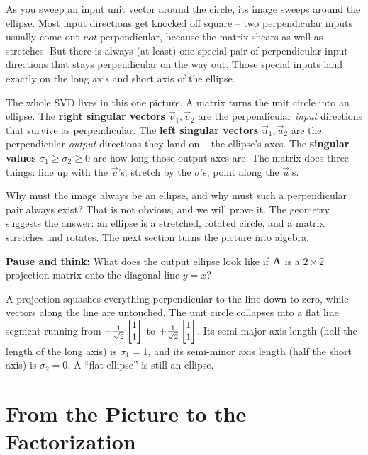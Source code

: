 As you sweep
an input unit vector around the circle, its image sweeps around the ellipse. Most
input directions get knocked off square -- two perpendicular inputs usually come
out \emph{not} perpendicular, because the matrix shears as well as stretches. But
there is always (at least) one special pair of perpendicular input directions
that stays perpendicular on the way out. Those special inputs land exactly on the
long axis and short axis of the ellipse.

\begin{intuitionbox}
The whole SVD lives in this one picture. A matrix turns the unit circle into an
ellipse. The \textbf{right singular vectors} $\vec{v}_1, \vec{v}_2$ are the
perpendicular \emph{input} directions that survive as perpendicular. The
\textbf{left singular vectors} $\vec{u}_1, \vec{u}_2$ are the perpendicular
\emph{output} directions they land on -- the ellipse's axes. The
\textbf{singular values} $\sigma_1 \ge \sigma_2 \ge 0$ are how long those output
axes are. The matrix does three things: line up with the
$\vec{v}$'s, stretch by the $\sigma$'s, point along the $\vec{u}$'s.
\end{intuitionbox}

Why must the image always be an ellipse, and why must such a perpendicular pair
always exist? That is not obvious, and we will prove it. The geometry suggests
the answer: an ellipse is a stretched, rotated circle, and a
matrix stretches and rotates. The next section turns the picture
into algebra.

\begin{recoverybox}
\textbf{Pause and think:} What does the output ellipse look like if $\mathbf{A}$ is
a $2\times 2$ projection matrix onto the diagonal line $y = x$?

A projection squashes everything perpendicular to the line down to zero, while
vectors along the line are untouched. The unit circle collapses into a flat
line segment running from $-\frac{1}{\sqrt2}\begin{bmatrix}1\\1\end{bmatrix}$ to
$+\frac{1}{\sqrt2}\begin{bmatrix}1\\1\end{bmatrix}$. Its semi-major axis length (half the length
of the long axis) is $\sigma_1 = 1$, and its semi-minor axis length (half the
short axis) is $\sigma_2 = 0$. A ``flat ellipse'' is still an
ellipse.
\end{recoverybox}

\section{From the Picture to the Factorization}
\label{ch29:to-factorization}

